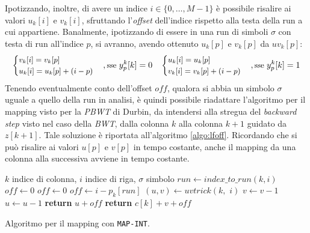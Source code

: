 Ipotizzando, inoltre, di avere
un indice $i\in\{0,\ldots,M-1\}$ è possibile risalire ai valori
$u_k[i]$ e $v_k[i]$, sfruttando l'\textit{offset} dell'indice rispetto alla
testa della run a cui appartiene. Banalmente, ipotizzando di essere in una run
di simboli $\sigma$ con testa di run all'indice $p$, si avranno, avendo
ottenuto $u_k[p]$ e $v_k[p]$ da $uv_k[p]$:
\begin{equation}
  \small
  \label{eq:naive2}
  \begin{cases}
    v_k[i]=v_k[p]\\
    u_k[i]=u_k[p]+(i-p)
  \end{cases},\mbox{sse } y^k_p[k]=0
  \quad
  \begin{cases}
    u_k[i]=u_k[p]\\
    v_k[i]=v_k[p]+(i-p)
  \end{cases},\mbox{sse } y^k_p[k]=1
\end{equation}
Tenendo eventualmente conto dell'offset $off$, qualora si abbia un simbolo
$\sigma$ uguale a quello della run in analisi, è quindi possibile
riadattare l'algoritmo per il 
mapping visto per la \textit{PBWT} di Durbin, da intendersi alla stregua del
\textit{backward step} visto nel caso 
della \textit{BWT}, dalla colonna $k$ alla colonna $k+1$ guidato da
$z[k+1]$. Tale soluzione è riportata all'algoritmo \ref{algo:lfoff}.
Ricordando che si può risalire ai valori $u[p]$ e $v[p]$ in tempo costante,
anche il mapping da una colonna alla successiva avviene in tempo costante.
\begin{algorithm}
  \begin{algorithmic}[1]
    \Comment $k$ indice di colonna, $i$ indice di riga, $\sigma$ simbolo
    \State $run\gets index\_to\_run(k,i)$
    \State $off\gets 0$
    \State $off\gets 0$
    \Else
    \State $off\gets i-p_k[run]$
    \EndIf
    \State $(u,v)\gets uvtrick(k,\,\,i)$
    \State $v\gets v-1$
    \Else
    \State $u\gets u-1$
    \EndIf
    \EndIf
    \State \textbf{return} $u+off$
    \Else
    \State \textbf{return} $c[k]+v+off$
    \EndIf
    \EndFunction
  \end{algorithmic}
  \caption{Algoritmo per il mapping con \texttt{MAP-INT}.}
  \label{algo:lfoff}
\end{algorithm}
